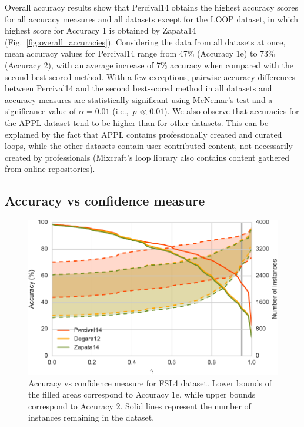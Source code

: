 \documentclass{article}
\begin{document}
Overall accuracy results show that Percival14 obtains the highest accuracy scores for all accuracy measures and all datasets except for the LOOP dataset, in which highest score for Accuracy 1 is obtained by Zapata14 (Fig.~\ref{fig:overall_accuracies}). Considering the data from all datasets at once, mean accuracy values for Percival14 range from 47\% (Accuracy 1e) to 73\% (Accuracy 2), with an average increase of 7\% accuracy when compared with the second best-scored method. With a few exceptions, pairwise accuracy differences between Percival14 and the second best-scored method in all datasets and accuracy measures are statistically significant using McNemar's test and a significance value of $\alpha=0.01$ (i.e.,~$p \ll 0.01$). 
We also observe that accuracies for the APPL dataset tend to be higher than for other datasets. This can be explained by the fact that APPL contains professionally created and curated loops, while the other datasets contain user contributed content, not necessarily created by professionals (Mixcraft's loop library also contains content gathered from online repositories).

\subsection{Accuracy vs confidence measure}\label{sec:results_confidence}

\begin{figure}
 \centerline{
 \includegraphics[width=0.91\columnwidth]{figs/accuracy_vs_confidence_FSL4-crop.pdf}}
 \caption{Accuracy vs confidence measure for FSL4 dataset. Lower bounds of the filled areas correspond to Accuracy 1e, while upper bounds correspond to Accuracy 2. Solid lines represent the number of instances remaining in the dataset.}
 \label{fig:accuracy_vs_confidence_FSL4}
\end{figure}
\end{document}
